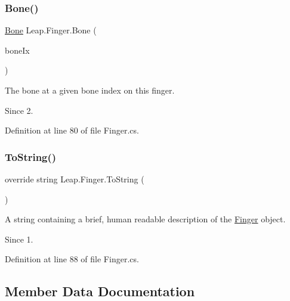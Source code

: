 \subsubsection{\texorpdfstring{Bone()}{Bone()}}
{\footnotesize\ttfamily \mbox{\hyperlink{class_leap_1_1_bone}{Bone}} Leap.\+Finger.\+Bone (\begin{DoxyParamCaption}\item[{\mbox{\hyperlink{class_leap_1_1_bone_a21054e31cefa7b75f25a026006fdbb1b}{Bone.\+Bone\+Type}}}]{bone\+Ix }\end{DoxyParamCaption})}



The bone at a given bone index on this finger. 

\begin{DoxySince}{Since}
2. 
\end{DoxySince}


Definition at line 80 of file Finger.\+cs.

\mbox{\label{class_leap_1_1_finger_a35cbefd8df3c7bc8a1f0d45a45105fa0}} 
\subsubsection{\texorpdfstring{ToString()}{ToString()}}
{\footnotesize\ttfamily override string Leap.\+Finger.\+To\+String (\begin{DoxyParamCaption}{ }\end{DoxyParamCaption})}



A string containing a brief, human readable description of the \mbox{\hyperlink{class_leap_1_1_finger}{Finger}} object. 

\begin{DoxySince}{Since}
1. 
\end{DoxySince}


Definition at line 88 of file Finger.\+cs.



\subsection{Member Data Documentation}
\mbox{\label{class_leap_1_1_finger_a86f26bdb56cc3550a9f86120263e0319}} 
